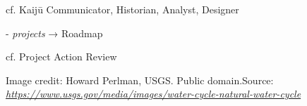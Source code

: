 \documentclass{article}
\begin{document}
\begin{figure}[h]
\begin{adjustbox}{minipage=[c]{\textwidth-10mm},margin= 5mm 15mm 5mm 15mm, frame=1pt, bgcolor=almond,env=center}
\begin{center}
\begin{minipage}[t]{0.7\paperwidth}
\quad\quad cf. {\sc Kaijū Communicator}, {\sc Historian}, {\sc Analyst}, {\sc Designer} \smallskip

- \emph{projects} → {\sc Roadmap}

\quad\quad cf. {\sc Project Action Review}

\end{minipage}
\end{center}
\caption*{Image credit: Howard Perlman, USGS. Public domain.\newline Source:
  \href{https://www.usgs.gov/media/images/water-cycle-natural-water-cycle}{\emph{https://www.usgs.gov/media/images/water-cycle-natural-water-cycle}}}
\end{adjustbox}
\end{figure}
\end{document}
